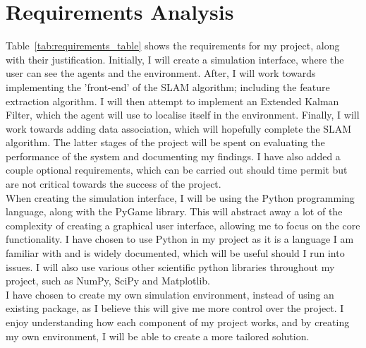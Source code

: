 \documentclass[12pt]{article}
\begin{document}
\section{Requirements Analysis}
Table~\ref{tab:requirements_table} shows the requirements for my project, along with their justification. Initially, I will
create a simulation interface, where the user can see the agents and the environment. After, I will work towards implementing
the 'front-end' of the SLAM algorithm; including the feature extraction algorithm. I will then attempt to implement an Extended Kalman
Filter, which the agent will use to localise itself in the environment. Finally, I will work towards adding data association, which will
hopefully complete the SLAM algorithm. The latter stages of the project will be spent on evaluating the performance of the system
and documenting my findings. I have also added a couple optional requirements, which can be carried out should time permit but are
not critical towards the success of the project.\\
When creating the simulation interface, I will be using the Python programming language, along with the PyGame library. This
will abstract away a lot of the complexity of creating a graphical user interface, allowing me to focus on the core functionality.
I have chosen to use Python in my project as it is a language I am familiar with and is widely documented, which will be useful
should I run into issues. I will also use various other scientific python libraries throughout my project, such as NumPy, SciPy and
Matplotlib.\\
 I have chosen to create my own simulation environment, instead of using an existing package, as I believe this will give me more
control over the project. I enjoy understanding how each component of my project works, and by creating my own environment, I will be able
to create a more tailored solution.\\
\end{document}
